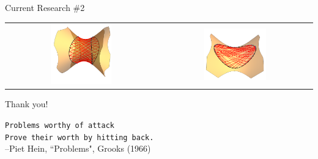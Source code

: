 \documentclass[compress,aspectratio=169,10pt,usenames,dvipsnames]{beamer}
\begin{document}
\begin{frame}

\begin{block}{Current Research \#2}
\end{block}

\begin{center}
\begin{tabular}{c c}
\includegraphics[width=0.42\textwidth]{A1HyperboloidTrajectory1} & \includegraphics[width=0.42\textwidth]{A2HyperboloidTrajectory1}   
\end{tabular}
\end{center}

\end{frame}


\begin{frame}

\vfill

\Huge
\begin{center}
Thank you! 
\end{center}

\vfill

\normalsize
\begin{center}
{\tt Problems worthy of attack \\ Prove their worth by hitting back.} \\
--Piet Hein, ``Problems", Grooks (1966)
\end{center}

\vfill

\end{frame}

\end{document}
